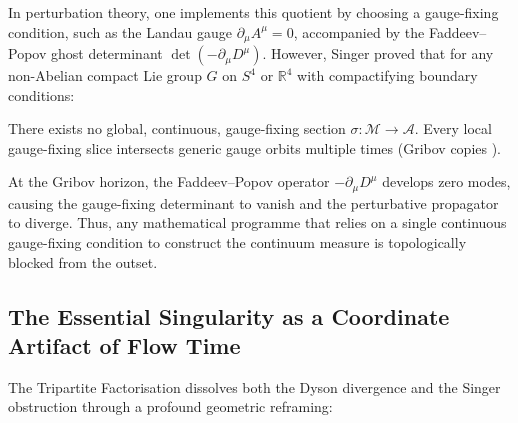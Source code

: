 In perturbation theory, one implements this quotient by choosing a gauge-fixing condition, such as the Landau gauge $\partial_\mu A^\mu = 0$, accompanied by the Faddeev--Popov ghost determinant $\det(-\partial_\mu D^\mu)$. However, Singer proved that for any non-Abelian compact Lie group $G$ on $S^4$ or $\mathbb{R}^4$ with compactifying boundary conditions:
\begin{theorem}
\label{thm:singer_nonexistence_ch8}
There exists no global, continuous, gauge-fixing section $\sigma : \mathcal{M} \to \mathcal{A}$. Every local gauge-fixing slice intersects generic gauge orbits multiple times (Gribov copies \cite{Gribov1978}).
\end{theorem}

At the Gribov horizon, the Faddeev--Popov operator $-\partial_\mu D^\mu$ develops zero modes, causing the gauge-fixing determinant to vanish and the perturbative propagator to diverge. Thus, any mathematical programme that relies on a single continuous gauge-fixing condition to construct the continuum measure is topologically blocked from the outset.

\subsection{The Essential Singularity as a Coordinate Artifact of Flow Time}
\label{subsec:coordinate_artifact}

The Tripartite Factorisation dissolves both the Dyson divergence and the Singer obstruction through a profound geometric reframing:

